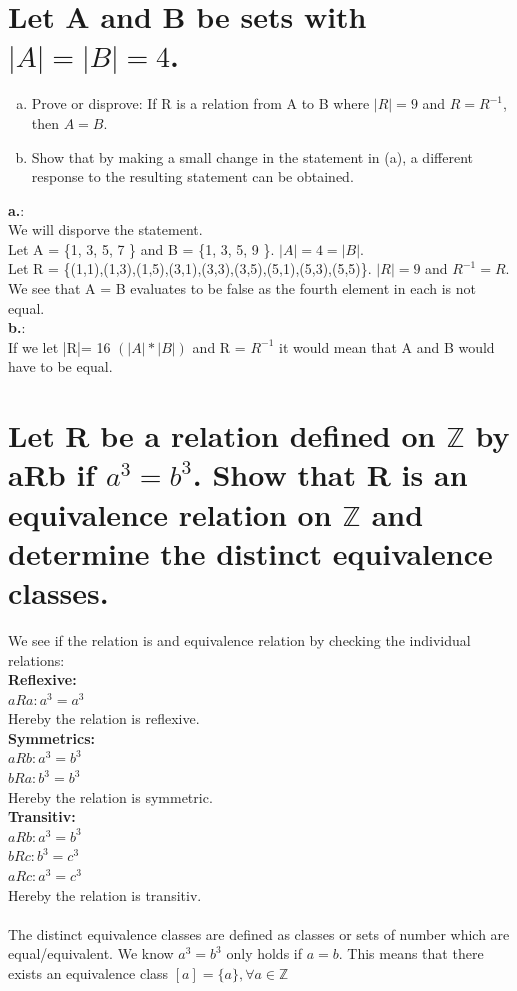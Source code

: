 \section{Let A and B be sets with $|A|=|B|=4$.}
\begin{enumerate}[a.]
\item Prove or disprove: If R is a relation from A to B where $|R|=9$ and $R = R^{-1}$, then $A=B$.
\item Show that by making a small change in the statement in (a), a different response to the resulting statement can be obtained.
\end{enumerate}
\textbf{a.}:\\
We will disporve the statement.\\
Let A = \{1, 3, 5, 7 \} and B = \{1, 3, 5, 9 \}.  $|A| = 4 = |B|$.\\
Let R = \{(1,1),(1,3),(1,5),(3,1),(3,3),(3,5),(5,1),(5,3),(5,5)\}. $|R|=9$ and $R^{-1} = R$.\\
We see that A = B evaluates to be false as the fourth element in each is not equal.\\
\textbf{b.}:\\
If we let |R|= 16 $(|A| * |B|)$ and R = $R^{-1}$ it would mean that A and B would have to be equal.
\newpage
\section{Let R be a relation defined on $\mathbb{Z}$ by aRb if $a^3 = b^3$. Show that R is an equivalence relation on $\mathbb{Z}$ and determine the distinct equivalence classes.}
We see if the relation is and equivalence relation by checking the individual relations:\\
\textbf{Reflexive:}\\
$aRa: a^3=a^3$\\ 
Hereby the relation is reflexive.\\
\textbf{Symmetrics:}\\
$aRb: a^3=b^3$\\
$bRa: b^3=b^3$\\
Hereby the relation is symmetric.\\
\textbf{Transitiv:}\\
$aRb: a^3=b^3$\\
$bRc: b^3=c^3$\\
$aRc: a^3=c^3$\\
Hereby the relation is transitiv.\\
\\
The distinct equivalence classes are defined as classes or sets of number which are equal/equivalent. We know $a^3=b^3$ only holds if $a=b$. This means that there exists an equivalence class $[a]=\{a\},  \forall a \in \mathbb{Z}$

